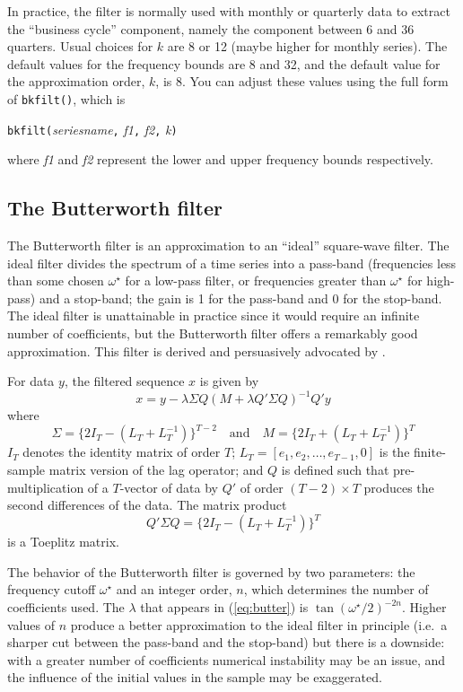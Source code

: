 In practice, the filter is normally used with monthly or quarterly
data to extract the ``business cycle'' component, namely the component
between 6 and 36 quarters. Usual choices for $k$ are 8 or 12 (maybe
higher for monthly series).  The default values for the frequency
bounds are 8 and 32, and the default value for the approximation
order, $k$, is 8. You can adjust these values using the full form
of \verb+bkfilt()+, which is

\texttt{bkfilt(}\textsl{seriesname}\texttt{,} \textsl{f1}\texttt{,} 
 \textsl{f2}\texttt{,} \textsl{k}\texttt{)}

where \textsl{f1} and \textsl{f2} represent the lower and upper
frequency bounds respectively.

\subsection{The Butterworth filter}
\label{sec:butterworth}

The Butterworth filter \citep{butterworth30} is an approximation to an
``ideal'' square-wave filter. The ideal filter divides the spectrum of
a time series into a pass-band (frequencies less than some chosen
$\omega^{\star}$ for a low-pass filter, or frequencies greater than
$\omega^{\star}$ for high-pass) and a stop-band; the gain is 1 for the
pass-band and 0 for the stop-band. The ideal filter is unattainable in
practice since it would require an infinite number of coefficients,
but the Butterworth filter offers a remarkably good
approximation. This filter is derived and persuasively advocated by
\cite{pollock97}.

For data $y$, the filtered sequence $x$ is given by
%
\begin{equation}
\label{eq:butter}
x = y - \lambda \Sigma Q(M + \lambda Q'\Sigma Q)^{-1}Q'y
\end{equation}
%
where
\[
\Sigma = \{2I_T - (L_T +  L^{-1}_T)\}^{T-2}
\quad \mbox{and} \quad
M =   \{2I_T + (L_T +  L^{-1}_T)\}^{T}
\]
%
$I_T$ denotes the identity matrix of order $T$; $L_T = [e_1, e_2,
\ldots, e_{T-1}, 0]$ is the finite-sample matrix version of the lag
operator; and $Q$ is defined such that pre-multiplication of a
$T$-vector of data by $Q'$ of order $(T-2) \times T$ produces the
second differences of the data. The matrix product
\[
Q'\Sigma Q = \{2I_T - (L_T +  L^{-1}_T)\}^{T}
\]
is a Toeplitz matrix.

The behavior of the Butterworth filter is governed by two parameters:
the frequency cutoff $\omega^{\star}$ and an integer order, $n$, which
determines the number of coefficients used. The $\lambda$ that appears
in (\ref{eq:butter}) is $\tan(\omega^{\star}/2)^{-2n}$.  Higher
values of $n$ produce a better approximation to the ideal filter in
principle (i.e.\ a sharper cut between the pass-band and the
stop-band) but there is a downside: with a greater number of
coefficients numerical instability may be an issue, and the influence
of the initial values in the sample may be exaggerated.

